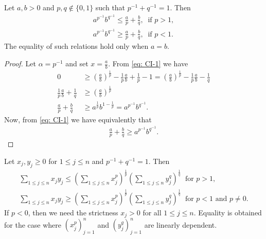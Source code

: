 \begin{proposition}\label{prop: young-ineq}
Let \(a, b >0\) and \(p, q \not\in \{0, 1\}\) such that \(p^{-1} + q^{-1} =
1\). Then
\begin{gather}
\label{eq: young-1}
a^{p^{-1}} b^{q^{-1}} \leq \frac a p  + \frac b q,\ \text{ if } p > 1,
\\
\label{eq: young-2}
a^{p^{-1}} b^{q^{-1}} \geq \frac a p  + \frac b q,\ \text{ if } p < 1.
\end{gather}
The equality of such relations hold only when \(a = b\).
\end{proposition}

\begin{proof}
Let \(\alpha = p^{-1}\) and set \(x = \frac a b\). From \cref{eq: CI-1} we
have
\begin{align*}
0 &\geq \left(\frac a b\right)^{\frac 1 p} - \frac 1 p \frac a b + \frac 1 p
- 1 = \left(\frac a b \right)^{\frac 1 p} - \frac 1 p \frac a b - \frac 1 q
\\
\frac 1 p \frac a b + \frac 1 q
    &\geq \left( \frac a b \right)^{\frac 1 p}
\\
\frac a p + \frac b q
    &\geq a^{\frac 1 p} b^{1 - \frac 1 p} = a^{p^{-1}} b^{q^{-1}}.
\end{align*}
Now, from \cref{eq: CI-1} we have equivalently that
\begin{align*}
\frac a p + \frac b q \geq a^{p^{-1}} b^{q^{-1}}.
\end{align*}
\end{proof}

\begin{proposition}\label{prop: holder-ineq}
Let \(x_j, y_j \geq 0\) for \(1 \leq j \leq n\) and \(p^{-1} + q^{-1} = 1\).
Then
\begin{gather}
\label{eq: holder-1}
\sum_{1 \leq j \leq n} x_j y_j \leq \left( \sum_{1 \leq j \leq n} x_j^p
\right)^{\frac 1 p} \left( \sum_{1 \leq j \leq n} y_j^q \right)^{\frac 1 q}\
\text{ for } p > 1, \\
\label{eq: holder-2}
\sum_{1 \leq j \leq n} x_j y_j \geq \left( \sum_{1 \leq j \leq n} x_j^p
\right)^{\frac 1 p} \left( \sum_{1 \leq j \leq n} y_j^q \right)^{\frac 1 q}\
\text{ for } p < 1 \text{ and } p \neq 0.
\end{gather}
If \(p < 0\), then we need the strictness \(x_j > 0\) for all \(1 \leq j \leq
n\). Equality is obtained for the case where \((x_j^p)_{j=1}^n\) and
\((y_j^q)_{j=1}^n\) are linearly dependent.
\end{proposition}

